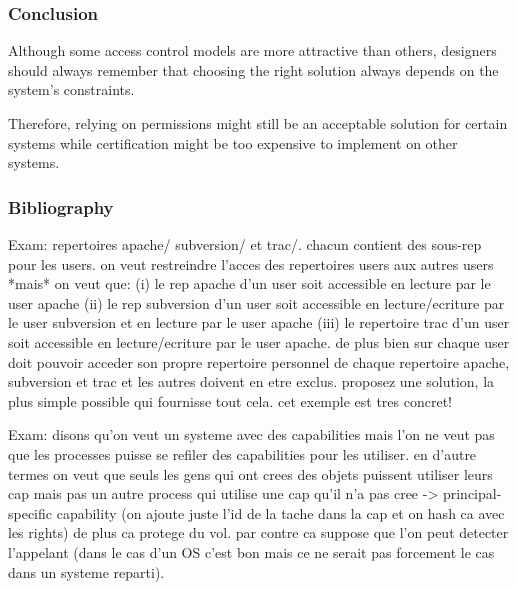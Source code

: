 \begin{frame}
  \frametitle{Conclusion}

  Although some access control models are more attractive than others,
  designers should always remember that choosing the right solution always
  depends on the system's constraints.

  \-

  Therefore, relying on  permissions might still be an acceptable
  solution for certain systems while certification might be too expensive
  to implement on other systems.
\end{frame}

%
%

\begin{frame}
  \frametitle{Bibliography}

  
  
\end{frame}



Exam: repertoires apache/ subversion/ et trac/. chacun contient des sous-rep
  pour les users. on veut restreindre l'acces des repertoires users aux autres
  users *mais* on veut que: (i) le rep apache d'un user soit accessible
  en lecture par le user apache (ii) le rep subversion d'un user soit
  accessible en lecture/ecriture par le user subversion et en lecture par
  le user apache (iii) le repertoire trac d'un user soit accessible en
  lecture/ecriture par le user apache.
  de plus bien sur chaque user doit pouvoir acceder son propre repertoire
  personnel de chaque repertoire apache, subversion et trac et les autres
  doivent en etre exclus.
  proposez une solution, la plus simple possible qui fournisse tout cela.
  cet exemple est tres concret!

Exam: disons qu'on veut un systeme avec des capabilities mais l'on ne veut
  pas que les processes puisse se refiler des capabilities pour les utiliser.
  en d'autre termes on veut que seuls les gens qui ont crees des objets
  puissent utiliser leurs cap mais pas un autre process qui utilise une cap
  qu'il n'a pas cree -> principal-specific capability (on ajoute juste l'id
  de la tache dans la cap et on hash ca avec les rights)
  de plus ca protege du vol. par contre ca suppose que l'on peut detecter
  l'appelant (dans le cas d'un OS c'est bon mais ce ne serait pas forcement
  le cas dans un systeme reparti).
